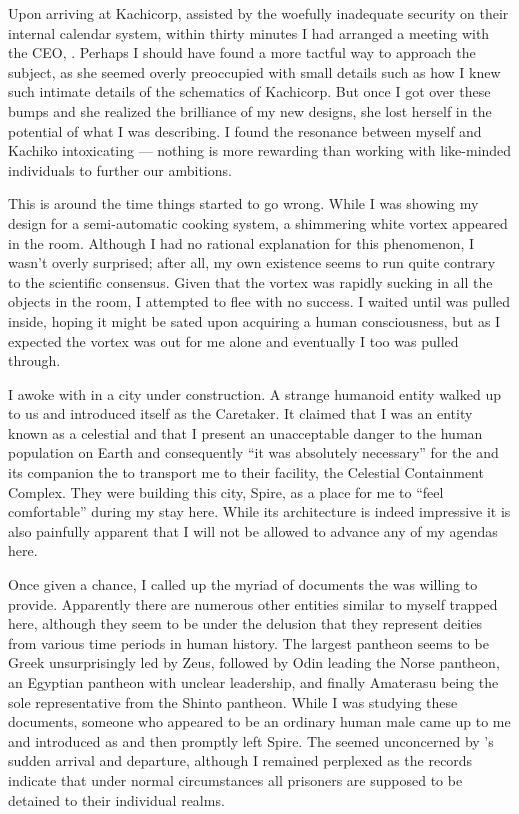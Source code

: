 \documentclass[char]{guardians}
\begin{document}
Upon arriving at Kachicorp, assisted by the woefully inadequate security on their internal calendar system, within thirty minutes I had arranged a meeting with the CEO, \cKachiko{}. Perhaps I should have found a more tactful way to approach the subject, as she seemed overly preoccupied with small details such as how I knew such intimate details of the schematics of Kachicorp. But once I got over these bumps and she realized the brilliance of my new designs, she lost herself in the potential of what I was describing. I found the resonance between myself and Kachiko intoxicating --- nothing is more rewarding than working with like-minded individuals to further our ambitions.

This is around the time things started to go wrong. While I was showing \cKachiko{} my design for a semi-automatic cooking system, a shimmering white vortex appeared in the room. Although I had no rational explanation for this phenomenon, I wasn't overly surprised; after all, my own existence seems to run quite contrary to the scientific consensus. Given that the vortex was rapidly sucking in all the objects in the room, I attempted to flee with no success. I waited until \cKachiko{} was pulled inside, hoping it might be sated upon acquiring a human consciousness, but as I expected the vortex was out for me alone and eventually I too was pulled through.

I awoke with \cKachiko{} in a city under construction. A strange humanoid entity walked up to us and introduced itself as the Caretaker. It claimed that I was an entity known as a celestial and that I present an unacceptable danger to the human population on Earth and consequently ``it was absolutely necessary'' for the \cCaretaker{} and its companion the \cWarden{} to transport me to their facility, the Celestial Containment Complex. They were building this city, Spire, as a place for me to ``feel comfortable'' during my stay here. While its architecture is indeed impressive it is also painfully apparent that I will not be allowed to advance any of my agendas here.

Once given a chance, I called up the myriad of documents the \cCaretaker{} was willing to provide. Apparently there are numerous other entities similar to myself trapped here, although they seem to be under the delusion that they represent deities from various time periods in human history. The largest pantheon seems to be Greek unsurprisingly led by Zeus, followed by Odin leading the Norse pantheon, an Egyptian pantheon with unclear leadership, and finally Amaterasu being the sole representative from the Shinto pantheon. While I was studying these documents, someone who appeared to be an ordinary human male came up to me and introduced \cJascha{\themself} as \cJascha{\intro} and then promptly left Spire. The \cWarden{} seemed unconcerned by \cJascha{}'s sudden arrival and departure, although I remained perplexed as the records indicate that under normal circumstances all prisoners are supposed to be detained to their individual realms.
\end{document}
